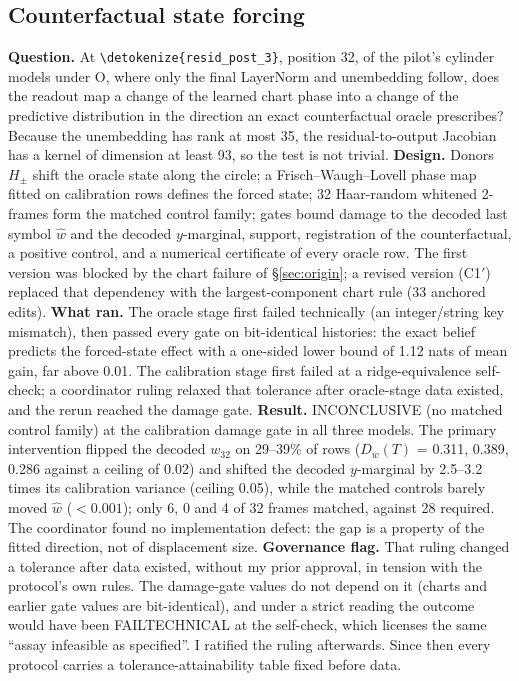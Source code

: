 \documentclass[11pt,a4paper]{article}
\DeclareRobustCommand{\_}{\ifmmode\origunderscore\else\textunderscore\allowbreak\fi}
\DeclareRobustCommand{\fpath}[1]{\begingroup\small\expandafter\nolinkurl\expandafter{\detokenize{#1}}\endgroup}
\newcommand{\Cp}{C1$'$}
\begin{document}
\subsection{Counterfactual state forcing}
\textbf{Question.} At \fpath{resid_post_3}, position 32, of the pilot's cylinder models under O,
where only the final LayerNorm and unembedding follow, does the readout map a change of the
learned chart phase into a change of the predictive distribution in the direction an exact
counterfactual oracle prescribes? Because the unembedding has rank at most 35, the
residual-to-output Jacobian has a kernel of dimension at least 93, so the test is not trivial.
\textbf{Design.} Donors $H_\pm$ shift the oracle state along the circle; a Frisch--Waugh--Lovell
phase map fitted on calibration rows defines the forced state; 32 Haar-random whitened 2-frames
form the matched control family; gates bound damage to the decoded last symbol $\hat w$ and the
decoded $y$-marginal, support, registration of the counterfactual, a positive control,
and a numerical certificate of every oracle row. The first version was blocked by the chart
failure of \S\ref{sec:origin}; a revised version (\Cp) replaced that dependency with the
largest-component chart rule (33 anchored edits).
\textbf{What ran.} The oracle stage first failed technically (an integer/string key mismatch),
then passed every gate on bit-identical histories: the exact belief predicts the forced-state
effect with a one-sided lower bound of 1.12 nats of mean gain, far above 0.01. The calibration
stage first failed at a ridge-equivalence self-check; a coordinator ruling relaxed that
tolerance after oracle-stage data existed, and the rerun reached the damage gate.
\textbf{Result.} INCONCLUSIVE (no matched control family) at the calibration damage gate in all
three models. The primary
intervention flipped the decoded $w_{32}$ on 29--39\% of rows ($D_w(T)$ = 0.311, 0.389, 0.286
against a ceiling of 0.02) and shifted the decoded $y$-marginal by 2.5--3.2 times its calibration
variance (ceiling 0.05), while the matched controls barely moved $\hat w$ ($<0.001$); only 6, 0 and 4
of 32 frames matched, against 28 required. The coordinator found no implementation defect: the gap
is a property of the fitted direction, not of displacement size.
\textbf{Governance flag.} That ruling changed a tolerance after data existed, without my prior
approval, in tension with the protocol's own rules. The damage-gate values do not depend on it
(charts and earlier gate values are bit-identical), and under a strict reading the outcome would
have been FAIL\_TECHNICAL at the self-check, which licenses the same ``assay infeasible as
specified''. I ratified the ruling afterwards. Since then every protocol carries a
tolerance-attainability table fixed before data.
\end{document}
